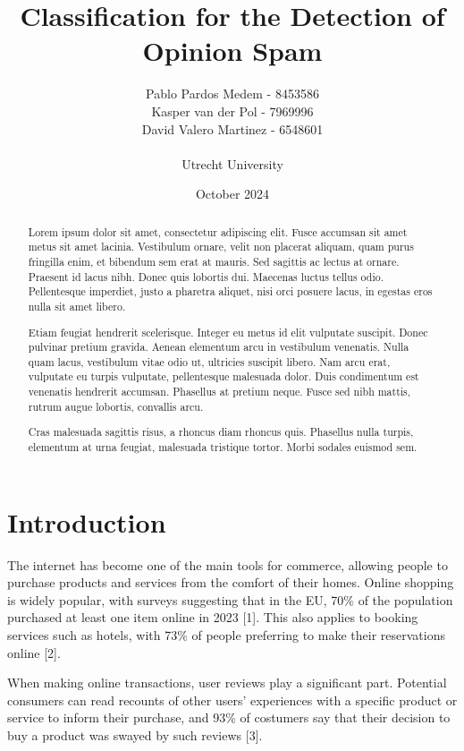 \documentclass[a4paper,11pt]{article}
\title{\vspace{-1cm}Classification for the Detection of Opinion Spam}
\author{Pablo Pardos Medem - 8453586\\ Kasper van der Pol - 7969996\\ David Valero Martinez - 6548601\\\\
Utrecht University}
\date{October 2024}
\begin{document}
\maketitle



\begin{abstract}

Lorem ipsum dolor sit amet, consectetur adipiscing elit. Fusce accumsan sit amet metus sit amet lacinia. Vestibulum ornare, velit non placerat aliquam, quam purus fringilla enim, et bibendum sem erat at mauris. Sed sagittis ac lectus at ornare. Praesent id lacus nibh. Donec quis lobortis dui. Maecenas luctus tellus odio. Pellentesque imperdiet, justo a pharetra aliquet, nisi orci posuere lacus, in egestas eros nulla sit amet libero.

Etiam feugiat hendrerit scelerisque. Integer eu metus id elit vulputate suscipit. Donec pulvinar pretium gravida. Aenean elementum arcu in vestibulum venenatis. Nulla quam lacus, vestibulum vitae odio ut, ultricies suscipit libero. Nam arcu erat, vulputate eu turpis vulputate, pellentesque malesuada dolor. Duis condimentum est venenatis hendrerit accumsan. Phasellus at pretium neque. Fusce sed nibh mattis, rutrum augue lobortis, convallis arcu.

Cras malesuada sagittis risus, a rhoncus diam rhoncus quis. Phasellus nulla turpis, elementum at urna feugiat, malesuada tristique tortor. Morbi sodales euismod sem.

\end{abstract}

\newpage

\section{Introduction}

The internet has become one of the main tools for commerce, allowing people to purchase products and services from the comfort of their homes. Online shopping is widely popular, with surveys suggesting that in the EU, 70\% of the population purchased at least one item online in 2023 [1]. This also applies to booking services such as hotels, with 73\% of people preferring to make their reservations online [2]. 

When making online transactions, user reviews play a significant part. Potential consumers can read recounts of other users' experiences with a specific product or service to inform their purchase, and 93\% of costumers say that their decision to buy a product was swayed by such reviews [3].  
\end{document}
